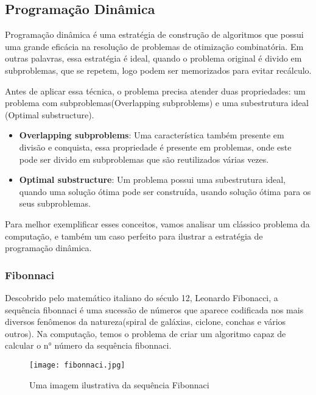 
  \subsection{Programação Dinâmica}

    Programação dinâmica é uma estratégia de construção de algoritmos que 
    possui uma grande eficácia na resolução de problemas de otimização combinatória.
    Em outras palavras, essa estratégia é ideal, quando o problema original 
    é divido em subproblemas, que se repetem, logo podem ser memorizados para 
    evitar recálculo.

    Antes de aplicar essa técnica, o problema precisa atender duas propriedades:
    um problema com subproblemas(Overlapping subproblems) e uma subestrutura ideal
    (Optimal substructure).

    \begin{itemize}
      \item \textbf{Overlapping subproblems}: Uma característica também presente em divisão 
      e conquista, essa propriedade é presente em problemas, onde este pode ser 
      divido em subproblemas que são reutilizados várias vezes.
      \item \textbf{Optimal substructure}: Um problema possui uma subestrutura ideal, quando 
      uma solução ótima pode ser construída, usando solução ótima para os seus subproblemas.
    \end{itemize}

    Para melhor exemplificar esses conceitos, vamos analisar um clássico problema da computação, 
    e também um caso perfeito para ilustrar a estratégia de programação dinâmica.

    \newpage

    \subsubsection{Fibonnaci}

    Descobrido pelo matemático italiano do século 12, Leonardo Fibonacci, a sequência 
    fibonnaci é uma sucessão de números que aparece codificada nos mais diversos fenômenos 
    da natureza(spiral de galáxias, ciclone, conchas e vários outros). Na computação, temos 
    o problema de criar um algoritmo capaz de calcular o n° número da sequência fibonnaci.

    \begin{figure}[ht]
      \centering
      \texttt{[image: fibonnaci.jpg]}
      \caption{Uma imagem ilustrativa da sequência Fibonnaci}
      \label{fig:fibonnaci}
    \end{figure}

